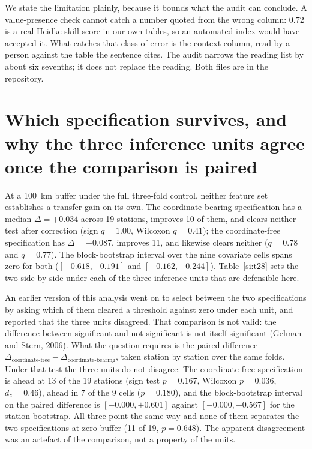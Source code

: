 \documentclass[11pt]{article}
\begin{document}
We state the limitation plainly, because it bounds what the audit can conclude. A value-presence
check cannot catch a number quoted from the wrong column: $0.72$ is a real Heidke skill
score in our own tables, so an automated index would have accepted it. What catches that
class of error is the context column, read by a person against the table the sentence
cites. The audit narrows the reading list by about six sevenths; it does not replace the
reading. Both files are in the repository.


\section{Which specification survives, and why the three inference units agree once the comparison is paired}
At a 100~km buffer under the full three-fold control, neither feature set establishes a
transfer gain on its own. The coordinate-bearing specification has a median
$\Delta=+0.034$ across 19 stations, improves 10 of them, and clears neither test after
correction (sign $q=1.00$, Wilcoxon $q=0.41$); the coordinate-free specification has
$\Delta=+0.087$, improves 11, and likewise clears neither ($q=0.78$ and $q=0.77$). The
block-bootstrap interval over the nine covariate cells spans zero for both
($[-0.618,+0.191]$ and $[-0.162,+0.244]$). Table~\ref{si:t28} sets the two side by side under each
of the three inference units that are defensible here.

An earlier version of this analysis went on to select between the two specifications by
asking which of them cleared a threshold against zero under each unit, and reported that
the three units disagreed. That comparison is not valid: the difference between
significant and not significant is not itself significant (Gelman and Stern, 2006). What the
question requires is the paired difference
$\Delta_{\text{coordinate-free}}-\Delta_{\text{coordinate-bearing}}$, taken station by
station over the same folds. Under that test the three units do not disagree. The
coordinate-free specification is ahead at 13 of the 19 stations (sign test $p=0.167$,
Wilcoxon $p=0.036$, $d_z=0.46$), ahead in 7 of the 9 cells ($p=0.180$), and the
block-bootstrap interval on the paired difference is $[-0.000,+0.601]$ against
$[-0.000,+0.567]$ for the station bootstrap. All three point the same way and none of them
separates the two specifications at zero buffer (11 of 19, $p=0.648$). The apparent
disagreement was an artefact of the comparison, not a property of the units.
\end{document}
